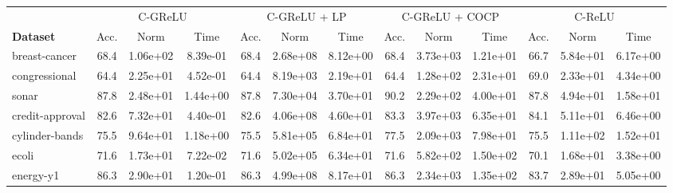 	\begin{table}[t]
		\centering
		\begin{tabular}{lcccccccccccc} \toprule
			                 & \multicolumn{3}{c}{C-GReLU} & \multicolumn{3}{c}{C-GReLU + LP} & \multicolumn{3}{c}{C-GReLU + COCP} & \multicolumn{3}{c}{C-ReLU}                                                                                   \\ \cmidrule(lr){2-4}  \cmidrule(lr){5-7}  \cmidrule(lr){8-10} \cmidrule(lr){11-13}
			\textbf{Dataset} & Acc.                        & Norm                             & Time                               & Acc.                       & Norm     & Time     & Acc.  & Norm     & Time     & Acc.  & Norm     & Time     \\ \midrule
			breast-cancer    & 68.4                        & 1.06e+02                         & 8.39e-01                           & 68.4                       & 2.68e+08 & 8.12e+00 & 68.4  & 3.73e+03 & 1.21e+01 & 66.7  & 5.84e+01 & 6.17e+00 \\
			congressional    & 64.4                        & 2.25e+01                         & 4.52e-01                           & 64.4                       & 8.19e+03 & 2.19e+01 & 64.4  & 1.28e+02 & 2.31e+01 & 69.0  & 2.33e+01 & 4.34e+00 \\
			sonar            & 87.8                        & 2.48e+01                         & 1.44e+00                           & 87.8                       & 7.30e+04 & 3.70e+01 & 90.2  & 2.29e+02 & 4.00e+01 & 87.8  & 4.94e+01 & 1.58e+01 \\
			credit-approval  & 82.6                        & 7.32e+01                         & 4.40e-01                           & 82.6                       & 4.06e+08 & 4.60e+01 & 83.3  & 3.97e+03 & 6.35e+01 & 84.1  & 5.11e+01 & 6.46e+00 \\
			cylinder-bands   & 75.5                        & 9.64e+01                         & 1.18e+00                           & 75.5                       & 5.81e+05 & 6.84e+01 & 77.5  & 2.09e+03 & 7.98e+01 & 75.5  & 1.11e+02 & 1.52e+01 \\
			ecoli            & 71.6                        & 1.73e+01                         & 7.22e-02                           & 71.6                       & 5.02e+05 & 6.34e+01 & 71.6  & 5.82e+02 & 1.50e+02 & 70.1  & 1.68e+01 & 3.38e+00 \\
			energy-y1        & 86.3                        & 2.90e+01                         & 1.20e-01                           & 86.3                       & 4.99e+08 & 8.17e+01 & 86.3  & 2.34e+03 & 1.35e+02 & 83.7  & 2.89e+01 & 5.05e+00 \\

\end{tabular}
\end{table}
